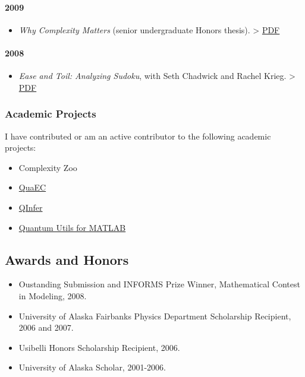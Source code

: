 \documentclass[]{article}
\begin{document}
\paragraph{2009}\label{section-4}

\begin{itemize}
\itemsep1pt\parskip0pt
\item
  \emph{Why Complexity Matters} (senior undergraduate Honors thesis).
  \textgreater{}
  \href{http://www.cgranade.com/research/papers/why-complexity-matters.pdf}{PDF}
\end{itemize}

\paragraph{2008}\label{section-5}

\begin{itemize}
\itemsep1pt\parskip0pt
\item
  \emph{Ease and Toil: Analyzing Sudoku}, with Seth Chadwick and Rachel
  Krieg. \textgreater{}
  \href{http://www.cgranade.com/research/papers/ease-and-toil.pdf}{PDF}
\end{itemize}

\subsubsection{Academic Projects}\label{academic-projects}

I have contributed or am an active contributor to the following academic
projects:

\begin{itemize}
\itemsep1pt\parskip0pt
\item
  Complexity Zoo
\item
  \href{http://github.com/cgranade/python-quaec}{QuaEC}
\item
  \href{http://github.com/csferrie/python-qinfer}{QInfer}
\item
  \href{https://github.com/CoryGroup/quantum-utils-matlab}{Quantum Utils
  for MATLAB}
\end{itemize}

\subsection{Awards and Honors}\label{awards-and-honors}

\begin{itemize}
\itemsep1pt\parskip0pt
\item
  Oustanding Submission and INFORMS Prize Winner, Mathematical Contest
  in Modeling, 2008.
\item
  University of Alaska Fairbanks Physics Department Scholarship
  Recipient, 2006 and 2007.
\item
  Usibelli Honors Scholarship Recipient, 2006.
\item
  University of Alaska Scholar, 2001-2006.
\end{itemize}
\end{document}
